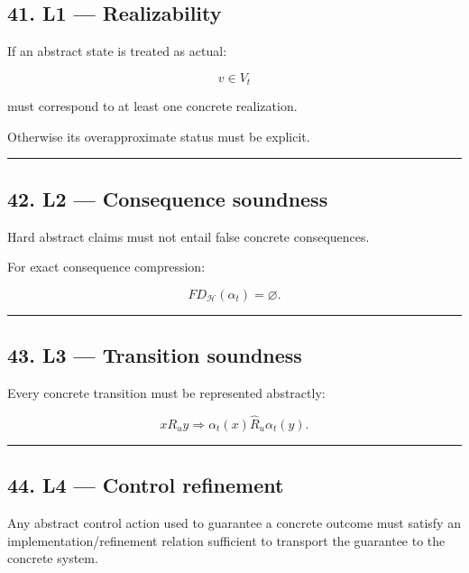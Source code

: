 \documentclass[
]{article}
\begin{document}
\subsection{41. L1 --- Realizability}\label{l1-realizability}

If an abstract state is treated as actual:

\[
v\in V_t
\]

must correspond to at least one concrete realization.

Otherwise its overapproximate status must be explicit.

\begin{center}\rule{0.5\linewidth}{0.5pt}\end{center}

\subsection{42. L2 --- Consequence
soundness}\label{l2-consequence-soundness}

Hard abstract claims must not entail false concrete consequences.

For exact consequence compression:

\[
\boxed{
FD_{\mathcal H}(\alpha_t)=\varnothing.
}
\]

\begin{center}\rule{0.5\linewidth}{0.5pt}\end{center}

\subsection{43. L3 --- Transition
soundness}\label{l3-transition-soundness}

Every concrete transition must be represented abstractly:

\[
\boxed{
xR_uy
\Rightarrow
\alpha_t(x)\widehat R_u\alpha_t(y).
}
\]

\begin{center}\rule{0.5\linewidth}{0.5pt}\end{center}

\subsection{44. L4 --- Control refinement}\label{l4-control-refinement}

Any abstract control action used to guarantee a concrete outcome must
satisfy an implementation/refinement relation sufficient to transport
the guarantee to the concrete system.
\end{document}
